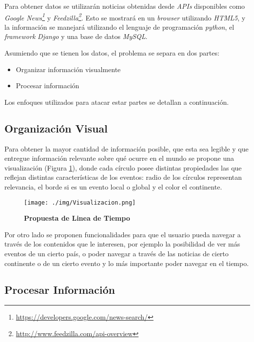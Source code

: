 \documentclass[10pt]{article}
\begin{document}
Para obtener datos se utilizarán noticias obtenidas desde \emph{APIs} disponibles como \emph{Google News\footnote{\url{https://developers.google.com/news-search/}}} y \emph{Feedzilla\footnote{\url{http://www.feedzilla.com/api-overview}}}. Esto se mostrará en un \emph{browser} utilizando \emph{HTML5}, y la información se manejará utilizando el lenguaje de programación \emph{python}, el \emph{framework} \emph{Django} y una base de datos \emph{MySQL}.

Asumiendo que se tienen los datos, el problema se separa en dos partes:

\begin{itemize}
	\item Organizar información visualmente
	\item Procesar información
\end{itemize}

Los enfoques utilizados para atacar estar partes se detallan a continuación.

\subsection{Organización Visual}

Para obtener la mayor cantidad de información posible, que esta sea legible y que entregue información relevante sobre qué ocurre en el mundo se propone una visualización (Figura \ref{lineatiempo}), donde cada círculo posee distintas propiedades las que reflejan distintas características de los eventos: radio de los círculos representan relevancia, el borde si es un evento local o global y el color el continente.

\begin{figure}[h!]
	\centering
    \texttt{[image: ./img/Visualizacion.png]}
	\caption{\textbf{Propuesta de Linea de Tiempo}}
	\label{lineatiempo}
\end{figure}

Por otro lado se proponen funcionalidades para que el usuario pueda navegar a través de los contenidos que le interesen, por ejemplo la posibilidad de ver más eventos de un cierto país, o poder navegar a través de las noticias de cierto continente o de un cierto evento y lo más importante poder navegar en el tiempo.

\subsection{Procesar Información}
\end{document}
